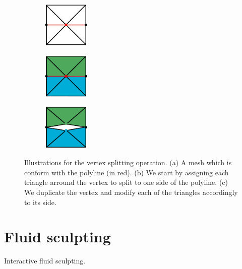 \documentclass[11pt, oneside, a4paper]{memoir}
\begin{document}
\begin{figure}[p]
\centering
\begin{subfigure}[c]{0.3\linewidth}
\centering
\includegraphics[height=2.2cm]{images/cutting-mig2015/vertex_splitting_1.pdf}
\caption{\label{fig:vertexSplitting1}}
\end{subfigure}
\begin{subfigure}[c]{0.3\linewidth}
\centering
\includegraphics[height=2.2cm]{images/cutting-mig2015/vertex_splitting_2.pdf}
\caption{\label{fig:vertexSplitting2}}
\end{subfigure}
\begin{subfigure}[c]{0.3\linewidth}
\centering
\includegraphics[height=2.2cm]{images/cutting-mig2015/vertex_splitting_3.pdf}
\caption{\label{fig:vertexSplitting3}}
\end{subfigure}
\caption{\label{fig:vertexSplitting} Illustrations for the vertex splitting operation. (a) A mesh which is conform with the polyline (in red). (b) We start by assigning each triangle arround the vertex to split to one side of the polyline. (c) We duplicate the vertex and modify each of the triangles accordingly to its side.}
\end{figure}


















\chapter{Fluid sculpting}
Interactive fluid sculpting.
\end{document}
